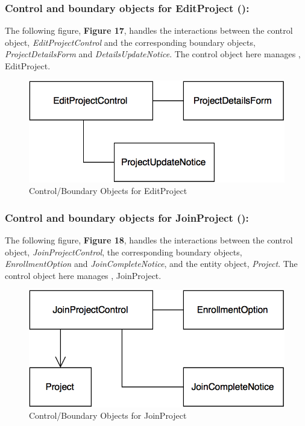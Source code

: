 \documentclass[12pt,letterpaper]{article}
\begin{document}
\subsubsection*{Control and boundary objects for EditProject (\editproject{}):}

The following figure, {\bf Figure 17}, handles the interactions between the control object, {\it EditProjectControl} and the corresponding boundary objects, 
{\it ProjectDetailsForm} and {\it DetailsUpdateNotice}. The control object here manages \editproject{}, EditProject.

\begin{figure}[H]
	\centering{}
	\includegraphics[scale=0.37]{imgs/cbod/edit-project.png}
	\caption{Control/Boundary Objects for EditProject}    
\end{figure}

\subsubsection*{Control and boundary objects for JoinProject (\joinproject{}):}

The following figure, {\bf Figure 18}, handles the interactions between the control object, {\it JoinProjectControl}, the corresponding boundary objects, 
{\it EnrollmentOption} and {\it JoinCompleteNotice}, and the entity object, {\it Project}. The control object here manages \joinproject{}, JoinProject.

\begin{figure}[H]
	\centering{}
	\includegraphics[scale=0.37]{imgs/cbod/join-project.png}
	\caption{Control/Boundary Objects for JoinProject}    
\end{figure}
\end{document}

